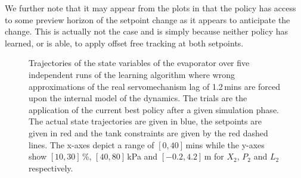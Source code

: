 We further note that it may appear from the plots in  that the policy has access to some preview horizon of the setpoint change as it appears to anticipate the change. This is actually not the case and is simply because neither policy has learned, or is able, to apply offset free tracking at both setpoints.




\begin{figure}[]
\centering \footnotesize
{}
\caption{Trajectories of the state variables of the evaporator over five independent runs of the learning algorithm where wrong approximations of the real servomechanism lag of 1.2$\,$mins are forced upon the internal model of the dynamics. The trials are the application of the current best policy after a given simulation phase. The actual state trajectories are given in blue, the setpoints are given in red and the tank constraints are given by the red dashed lines. The x-axes depict a range of $[0, 40]\,$mins while the y-axes show $[10, 30]\,$\%, $[40, 80]\,$kPa and $[-0.2, 4.2]\,$m for $X_2$, $P_2$ and $L_2$ respectively.}
\label{fig:laggy}
\end{figure}
